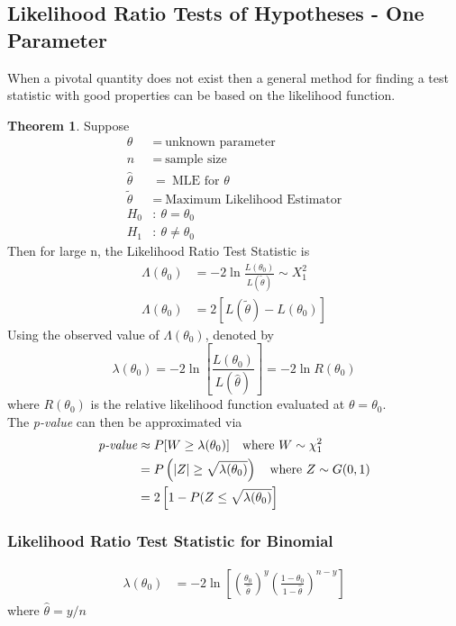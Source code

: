 \documentclass[12pt, leqno]{article}
\theoremstyle{definition}
\newtheorem*{theorem}{Theorem}
\begin{document}
  \subsection{Likelihood Ratio Tests of Hypotheses - One Parameter}
  When a pivotal quantity does not exist then a general method for finding a test statistic with good properties can be based on the likelihood function.
  \begin{theorem}
    Suppose
    \begin{align*}
      \theta &= ~\text{unknown parameter} \\
      n &= ~\text{sample size} \\
      \hat{\theta} &= ~\text{MLE for $\theta$} \\
      \widetilde{\theta} &= ~\text{Maximum Likelihood Estimator} \\
      H_{0} &: ~\theta = \theta_{0} \\
      H_{1} &: ~\theta \not = \theta_{0}
    \end{align*}
    Then for large n, the Likelihood Ratio Test Statistic is
    \begin{align*}
    \Lambda(\theta_{0}) &= -2\ln{\frac{L(\theta_{0})}{L(\widetilde{\theta})}} \sim X_{1}^{2} \\
    \Lambda(\theta_{0}) &= 2[L(\widetilde{\theta}) - L(\theta_{0})]
    \end{align*}
    Using the observed value of $\Lambda(\theta_{0})$, denoted by
    $$
    \lambda(\theta_{0})
    = -2\ln{\left[\frac{L(\theta_{0})}{L(\hat{\theta})}\right]}
    = -2\ln{R(\theta_0)}
    $$
    where $R(\theta_0)$ is the relative likelihood function evaluated at $\theta = \theta_0$. \\
    The \emph{p-value} can then be approximated via
    \begin{align*}
      \emph{p-value}
      &\approx P[W\geq \lambda(\theta_0)]~~~\text{where }W\sim \chi_{1}^{2} \\
      &= P\left(|Z|\geq \sqrt{\lambda(\theta_0)}\right) ~~~\text{where }Z\sim G(0, 1) \\
      &= 2\left[1 - P(Z \leq \sqrt{\lambda(\theta_0)}\right]
    \end{align*}
  \end{theorem}

  \subsubsection{Likelihood Ratio Test Statistic for Binomial}
  \begin{align*}
    \lambda(\theta_0)
    &= -2\ln{\left[\left(\frac{\theta_0}{\hat{\theta}}\right)^{y}\left(\frac{1 - \theta_0}{1 - \hat{\theta}}\right)^{n - y}\right]}
  \end{align*}
  where $\hat{\theta} = y/n$
\end{document}
